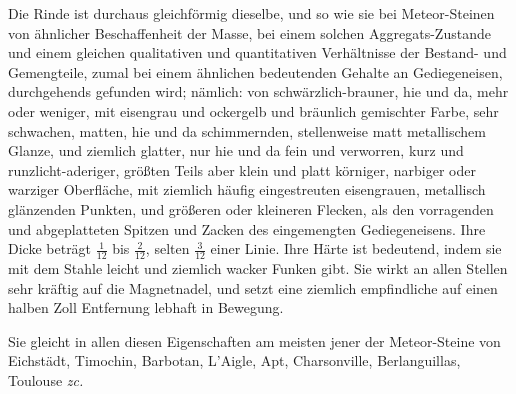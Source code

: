 \documentclass[a4paper, 11pt, oneside, german]{article}
\begin{document}
Die Rinde ist durchaus gleichförmig dieselbe, und so wie sie bei Meteor-Steinen von ähnlicher Beschaffenheit der Masse, bei einem solchen Aggregats-Zustande und einem gleichen qualitativen und quantitativen Verhältnisse der Bestand- und Gemengteile, zumal bei einem ähnlichen bedeutenden Gehalte an Gediegeneisen, durchgehends gefunden wird; nämlich: von schwärzlich-brauner, hie und da, mehr oder weniger, mit eisengrau und ockergelb und bräunlich gemischter Farbe, sehr schwachen, matten, hie und da schimmernden, stellenweise matt metallischem Glanze, und ziemlich glatter, nur hie und da fein und verworren, kurz und runzlicht-aderiger, größten Teils aber klein und platt körniger, narbiger oder warziger Oberfläche, mit ziemlich häufig eingestreuten eisengrauen, metallisch glänzenden Punkten, und größeren oder kleineren Flecken, als den vorragenden und abgeplatteten Spitzen und Zacken des eingemengten Gediegeneisens. Ihre Dicke beträgt $\frac{1}{12}$ bis $\frac{2}{12}$, selten $\frac{3}{12}$ einer Linie. Ihre Härte ist bedeutend, indem sie mit dem Stahle leicht und ziemlich wacker Funken gibt. Sie wirkt an allen Stellen sehr kräftig auf die Magnetnadel, und setzt eine ziemlich empfindliche auf einen halben Zoll Entfernung lebhaft in Bewegung.

Sie gleicht in allen diesen Eigenschaften am meisten jener der Meteor-Steine von Eichstädt, Timochin, Barbotan, L'Aigle, Apt, Charsonville, Berlanguillas, Toulouse \emph{zc.}
\end{document}
